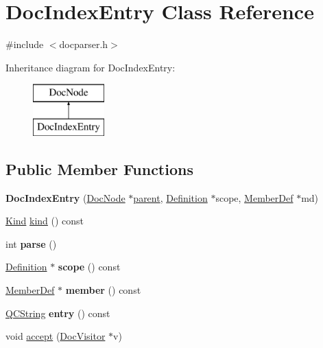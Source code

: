 \hypertarget{class_doc_index_entry}{}\section{Doc\+Index\+Entry Class Reference}
\label{class_doc_index_entry}


{\ttfamily \#include $<$docparser.\+h$>$}

Inheritance diagram for Doc\+Index\+Entry\+:\begin{figure}[H]
\begin{center}
\leavevmode
\includegraphics[height=2.000000cm]{class_doc_index_entry}
\end{center}
\end{figure}
\subsection*{Public Member Functions}
\begin{DoxyCompactItemize}
\item 
\mbox{\label{class_doc_index_entry_a9e5a1d9e1d68e7da638b3f87bc658a9d}} 
{\bfseries Doc\+Index\+Entry} (\mbox{\hyperlink{class_doc_node}{Doc\+Node}} $\ast$\mbox{\hyperlink{class_doc_node_a73e8ad29a91cfceb0968eb00db71a23d}{parent}}, \mbox{\hyperlink{class_definition}{Definition}} $\ast$scope, \mbox{\hyperlink{class_member_def}{Member\+Def}} $\ast$md)
\item 
\mbox{\hyperlink{class_doc_node_aebd16e89ca590d84cbd40543ea5faadb}{Kind}} \mbox{\hyperlink{class_doc_index_entry_a246d8de74105d446f2544b8aa51be833}{kind}} () const
\item 
\mbox{\label{class_doc_index_entry_a32f8c84b803b04fd2de18d647593c8fe}} 
int {\bfseries parse} ()
\item 
\mbox{\label{class_doc_index_entry_ae6dc13720be053a9da1fc81a5088f624}} 
\mbox{\hyperlink{class_definition}{Definition}} $\ast$ {\bfseries scope} () const
\item 
\mbox{\label{class_doc_index_entry_ac1e61b5c208825819cf8860a8dc0b1b9}} 
\mbox{\hyperlink{class_member_def}{Member\+Def}} $\ast$ {\bfseries member} () const
\item 
\mbox{\label{class_doc_index_entry_ac267b515c9df901ab1505e070931996c}} 
\mbox{\hyperlink{class_q_c_string}{Q\+C\+String}} {\bfseries entry} () const
\item 
void \mbox{\hyperlink{class_doc_index_entry_a509e4da75e8dbfaf40488509357c6e3c}{accept}} (\mbox{\hyperlink{class_doc_visitor}{Doc\+Visitor}} $\ast$v)
\end{DoxyCompactItemize}
